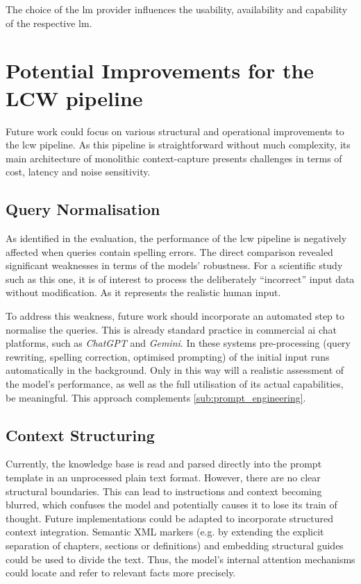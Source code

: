 The choice of the \ac{lm} provider influences the usability, availability and capability of the respective \ac{lm}.
\section[Improvements - LCW pipeline]{Potential Improvements for the LCW pipeline}

Future work could focus on various structural and operational improvements to the \ac{lcw} pipeline.
As this pipeline is straightforward without much complexity, its main architecture of monolithic context-capture presents challenges in terms of cost, latency and noise sensitivity.
\subsection{Query Normalisation}
As identified in the evaluation, the performance of the \ac{lcw} pipeline is negatively affected when queries contain spelling errors.
The direct comparison revealed significant weaknesses in terms of the models’ robustness.
For a scientific study such as this one, it is of interest to process the deliberately \enquote{incorrect} input data without modification.
As it represents the realistic human input.

To address this weakness, future work should incorporate an automated step to normalise the queries.
This is already standard practice in commercial \ac{ai} chat platforms, such as \textit{ChatGPT} and \textit{Gemini}.
In these systems pre-processing (query rewriting, spelling correction, optimised prompting) of the initial input runs automatically in the background.
Only in this way will a realistic assessment of the model’s performance, as well as the full utilisation of its actual capabilities, be meaningful.
This approach complements \cref{sub:prompt_engineering}.

\subsection{Context Structuring}
Currently, the knowledge base is read and parsed directly into the prompt template in an unprocessed plain text format.
However, there are no clear structural boundaries.
This can lead to instructions and context becoming blurred, which confuses the model and potentially causes it to lose its train of thought.
Future implementations could be adapted to incorporate structured context integration.
Semantic XML markers (e.g. by extending the explicit separation of chapters, sections or definitions) and embedding structural guides could be used to divide the text.
Thus, the model’s internal attention mechanisms could locate and refer to relevant facts more precisely.
